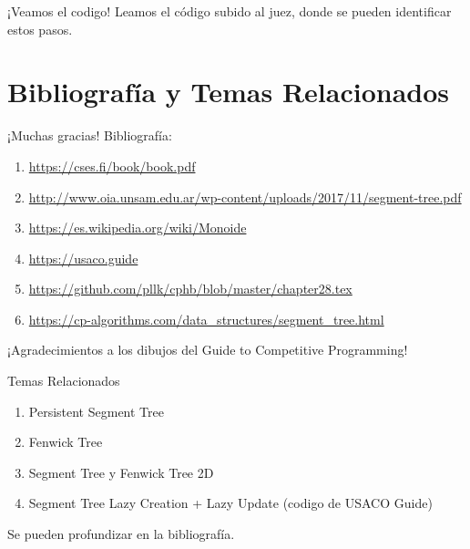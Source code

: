 \documentclass{beamer}
\begin{document}
\begin{frame}{¡Veamos el codigo!}
Leamos el código subido al juez, donde se pueden identificar estos pasos.
\end{frame}

\section{Bibliografía y Temas Relacionados}
\begin{frame}{¡Muchas gracias!}
Bibliografía:

\begin{enumerate}
    \item \url{https://cses.fi/book/book.pdf}
    \item \url{http://www.oia.unsam.edu.ar/wp-content/uploads/2017/11/segment-tree.pdf}
    \item \url{https://es.wikipedia.org/wiki/Monoide}
    \item \url{https://usaco.guide}
    \item \url{https://github.com/pllk/cphb/blob/master/chapter28.tex}
    \item \url{https://cp-algorithms.com/data_structures/segment_tree.html}
\end{enumerate}
¡Agradecimientos a los dibujos del Guide to Competitive Programming!
\end{frame}

\begin{frame}{Temas Relacionados}
\begin{enumerate}
    \item Persistent Segment Tree
    \item Fenwick Tree
    \item Segment Tree y Fenwick Tree 2D
    \item Segment Tree Lazy Creation + Lazy Update (codigo de USACO Guide)
\end{enumerate}
Se pueden profundizar en la bibliografía.
\end{frame}
\end{document}
